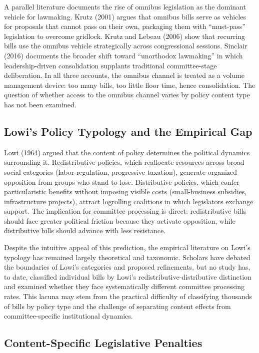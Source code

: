 \documentclass[11pt]{article}
\begin{document}
A parallel literature documents the rise of omnibus legislation as the dominant vehicle for lawmaking. Krutz (2001) argues that omnibus bills serve as vehicles for proposals that cannot pass on their own, packaging them with ``must-pass'' legislation to overcome gridlock. Krutz and Lebeau (2006) show that recurring bills use the omnibus vehicle strategically across congressional sessions. Sinclair (2016) documents the broader shift toward ``unorthodox lawmaking'' in which leadership-driven consolidation supplants traditional committee-stage deliberation. In all three accounts, the omnibus channel is treated as a volume management device: too many bills, too little floor time, hence consolidation. The question of whether access to the omnibus channel varies by policy content type has not been examined.

\subsection{Lowi's Policy Typology and the Empirical Gap}

Lowi (1964) argued that the content of policy determines the political dynamics surrounding it. Redistributive policies, which reallocate resources across broad social categories (labor regulation, progressive taxation), generate organized opposition from groups who stand to lose. Distributive policies, which confer particularistic benefits without imposing visible costs (small-business subsidies, infrastructure projects), attract logrolling coalitions in which legislators exchange support. The implication for committee processing is direct: redistributive bills should face greater political friction because they activate opposition, while distributive bills should advance with less resistance.

Despite the intuitive appeal of this prediction, the empirical literature on Lowi's typology has remained largely theoretical and taxonomic. Scholars have debated the boundaries of Lowi's categories and proposed refinements, but no study has, to date, classified individual bills by Lowi's redistributive-distributive distinction and examined whether they face systematically different committee processing rates. This lacuna may stem from the practical difficulty of classifying thousands of bills by policy type and the challenge of separating content effects from committee-specific institutional dynamics.

\subsection{Content-Specific Legislative Penalties}
\end{document}
